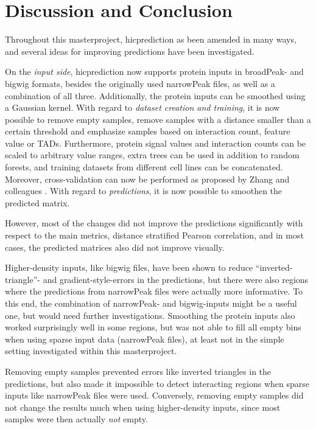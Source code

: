 \section{Discussion and Conclusion} \label{sec:discussion:main}
Throughout this masterproject, hicprediction as been amended in many ways,
and several ideas for improving predictions have been investigated.

On the \emph{input side}, hicprediction now supports protein inputs in broadPeak- and bigwig formats,
besides the originally used narrowPeak files, as well as a combination of all three.
Additionally, the protein inputs can be smoothed using a Gaussian kernel.
With regard to \emph{dataset creation and training}, it is now possible to
remove empty samples, remove samples with a distance smaller than a certain threshold 
and emphasize samples based on interaction count, feature value or TADs.
Furthermore, protein signal values and interaction counts can be scaled to arbitrary value ranges,
extra trees can be used in addition to random forests, and training datasets from different cell lines
can be concatenated. 
Moreover, cross-validation can now be performed as proposed by Zhang and colleagues \cite{Zhang2019}.
With regard to \emph{predictions}, it is now possible to smoothen the predicted matrix.

However, most of the changes did not improve the predictions significantly with respect
to the main metrics, distance stratified Pearson correlation,
and in most cases, the predicted matrices also did not improve visually.

Higher-density inputs, like bigwig files, 
have been shown to reduce ``inverted-triangle''- and gradient-style-errors in the predictions,
but there were also regions where the predictions from narrowPeak files 
were actually more informative.
To this end, the combination of narrowPeak- and bigwig-inputs might be a useful one,
but would need further investigations.
Smoothing the protein inputs also worked surprisingly well in some regions,
but was not able to fill all empty bins when using sparse input data (narrowPeak files),
at least not in the simple setting investigated within this masterproject.

Removing empty samples prevented errors like inverted triangles in the predictions,
but also made it impossible to detect interacting regions when sparse inputs like
narrowPeak files were used. 
Conversely, removing empty samples did not change the results much when using higher-density inputs, 
since most samples were then actually \emph{not} empty.

